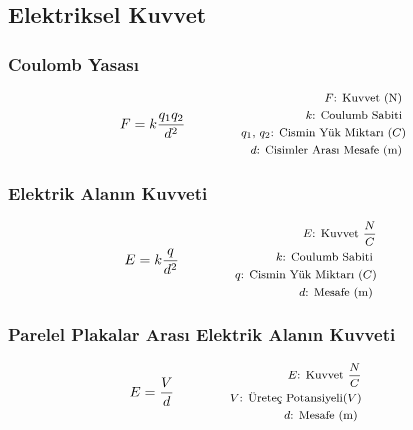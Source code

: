 \subsection{Elektriksel Kuvvet}

\subsubsection*{Coulomb Yasası}
\begin{equation}
    F = k\frac{q_1 q_2}{d^2} \qquad \qquad \parbox{4cm}{\footnotesize$\begin{aligned}
        F\text{: Kuvvet (N) } \\
        k\text{: Coulumb Sabiti } \\
        q_1\text{, }q_2\text{: Cismin Yük Miktarı } (C) \\
        d\text{: Cisimler Arası Mesafe (m) }
\end{aligned}$}
\end{equation}

\subsubsection*{Elektrik Alanın Kuvveti}
\begin{equation}
    E = k\frac{q}{d^2} \qquad \qquad \parbox{4cm}{\footnotesize$\begin{aligned}
        E\text{: Kuvvet } \frac{N}{C} \\
        k\text{: Coulumb Sabiti } \\
        q\text{: Cismin Yük Miktarı } (C) \\
        d\text{: Mesafe (m) }
\end{aligned}$}
\end{equation}

\subsubsection*{Parelel Plakalar Arası Elektrik Alanın Kuvveti}
\begin{equation}
    E = \frac{V}{d} \qquad \qquad \parbox{4cm}{\footnotesize$\begin{aligned}
        E\text{: Kuvvet } \frac{N}{C} \\
        V\text{: Üreteç Potansiyeli} (V) \\
        d\text{: Mesafe (m) }
\end{aligned}$}
\end{equation}